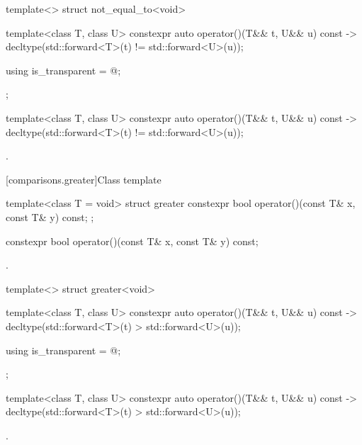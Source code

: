 %
\begin{itemdecl}
template<> struct not_equal_to<void> {
  template<class T, class U> constexpr auto operator()(T&& t, U&& u) const
    -> decltype(std::forward<T>(t) != std::forward<U>(u));

  using is_transparent = @\unspec@;
};
\end{itemdecl}

%
\begin{itemdecl}
template<class T, class U> constexpr auto operator()(T&& t, U&& u) const
    -> decltype(std::forward<T>(t) != std::forward<U>(u));
\end{itemdecl}

\begin{itemdescr}
\pnum
\returns
{}.
\end{itemdescr}

[comparisons.greater]{Class template }

%
\begin{itemdecl}
template<class T = void> struct greater {
  constexpr bool operator()(const T& x, const T& y) const;
};
\end{itemdecl}

%
\begin{itemdecl}
constexpr bool operator()(const T& x, const T& y) const;
\end{itemdecl}

\begin{itemdescr}
\pnum
\returns
{}.
\end{itemdescr}

%
\begin{itemdecl}
template<> struct greater<void> {
  template<class T, class U> constexpr auto operator()(T&& t, U&& u) const
    -> decltype(std::forward<T>(t) > std::forward<U>(u));

  using is_transparent = @\unspec@;
};
\end{itemdecl}

%
\begin{itemdecl}
template<class T, class U> constexpr auto operator()(T&& t, U&& u) const
    -> decltype(std::forward<T>(t) > std::forward<U>(u));
\end{itemdecl}

\begin{itemdescr}
\pnum
\returns
{}.
\end{itemdescr}


